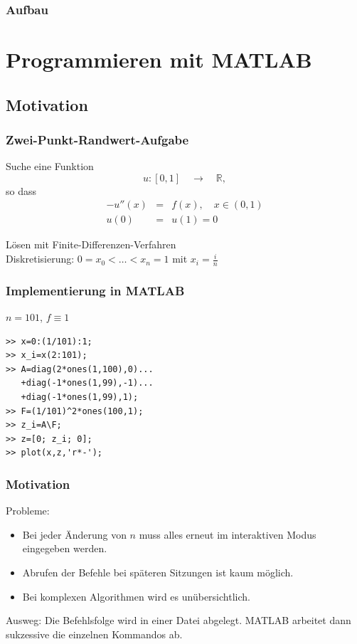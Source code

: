 \subtitle{Einheit 2}

\begin{frame}[fragile]
  \titlepage
\note{}
\end{frame}

\begin{frame}[fragile]
  \frametitle{Aufbau}
  \tableofcontents
\note{}
\end{frame}


\section{Programmieren mit MATLAB}
\subsection{Motivation}

\begin{frame}[fragile]\frametitle{Zwei-Punkt-Randwert-Aufgabe}

Suche eine Funktion 
\[ u:[0,1] \quad \rightarrow \quad \mathbb{R}, \] 
so dass 
\begin{eqnarray*}
-u''(x) & = & f(x), \quad x \in (0,1)\\
u(0) & = & u(1) =0
\end{eqnarray*}

\alert{Lösen mit Finite-Differenzen-Verfahren}\\
Diskretisierung: $0=x_{0} < \dots < x_{n}=1$ mit $x_i=\frac{i}{n}$\\
\end{frame}
\begin{frame}[fragile]\frametitle{Implementierung in MATLAB}
$n=101$, $f \equiv 1$

\begin{lstlisting}
>> x=0:(1/101):1;
>> x_i=x(2:101);
>> A=diag(2*ones(1,100),0)...
   +diag(-1*ones(1,99),-1)...
   +diag(-1*ones(1,99),1);
>> F=(1/101)^2*ones(100,1);
>> z_i=A\F;
>> z=[0; z_i; 0];
>> plot(x,z,'r*-');
\end{lstlisting}
\end{frame}

\begin{frame}[fragile]\frametitle{Motivation}
\alert{Probleme:} 
\begin{itemize}
\item
Bei jeder Änderung von $n$ muss alles erneut im
interaktiven Modus eingegeben werden.\\
\item 
Abrufen der Befehle bei späteren Sitzungen ist kaum möglich. 
\item Bei komplexen Algorithmen wird es unübersichtlich.
\end{itemize}
\alert{Ausweg:} Die Befehlsfolge wird in einer Datei
abgelegt. MATLAB arbeitet dann sukzessive die einzelnen Kommandos
ab. \\
\end{frame}

